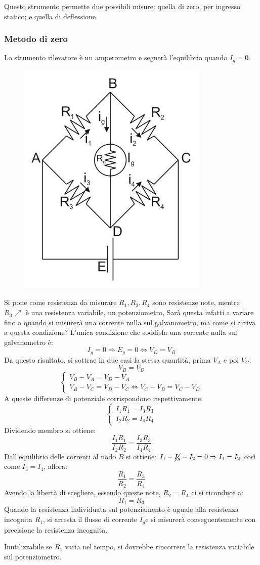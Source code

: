 \documentclass[a4paper, 15pt]{article}
\begin{document}
\begin{adjustwidth}{2in}{}
		Questo strumento permette due possibili misure: quella di zero, per ingresso statico; e quella di deflessione. 
\end{adjustwidth}
\newpage
\subsubsection{Metodo di zero}	
\begin{adjustwidth}{2in}{}
		Lo strumento rilevatore è un amperometro e segnerà l'equilibrio quando $I_g =0$. 		
\begin{figure}[H]
	\centering
	\includegraphics[width=0.3\linewidth]{fig/screenshot011}
	\label{fig:screenshot011.2}
\end{figure}		
		Si pone come resistenza da misurare $R_1, R_2, R_4$ sono resistenze note, mentre $R_3\nearrow$ è una resistenza variabile, un potenziometro, Sarà questa infatti a variare fino a quando si misurerà una corrente nulla sul galvanometro, ma come si arriva a questa condizione? L'unica condizione che soddisfa una corrente nulla sul galvanometro è:
		\[I_g = 0 \Rightarrow E_g = 0 \Leftrightarrow V_D = V_B\]
		Da questo risultato, si sottrae in due casi la stessa quantità, prima $V_A$ e poi $V_C$:
		\[V_B = V_D\]
		\[\begin{cases}
			V_B - V_A = V_D - V_A \\
			V_B - V_C = V_D - V_C \Leftrightarrow V_C - V_B = V_C - V_D
		\end{cases}
		\]
		A queste differenze di potenziale corrispondono rispettivamente:
		\[\begin{cases}
			I_1R_1 = I_3R_3 \\
			I_2R_2 = I_4R_4
		\end{cases}
		\]
		Dividendo membro si ottiene:
		\[\dfrac{I_1R_1}{I_2R_2} = \dfrac{I_3R_3}{I_4R_4}\]
		Dall'equilibrio delle correnti al nodo $B$ si ottiene: \(I_1 - \cancel{I_g} - I_2 = 0 \Rightarrow I_1 = I_2\) così come \(I_3 = I_4\), allora: 
		\[\dfrac{R_1}{R_2} = \dfrac{R_3}{R_4}\]
		Avendo la libertà di scegliere, essendo queste note, \(R_2 = R_4\) ci si riconduce a:
		\[ R_1 = R_3\]
		Quando la resistenza individuata sul potenziamento è uguale alla resistenza incognita $ R_1 $, si arresta il flusso di corrente $ I_g  $e si misurerà conseguentemente con precisione la resistenza incognita. \newline 
		
		Inutilizzabile se $R_1$ varia nel tempo, si dovrebbe rincorrere la resistenza variabile sul potenziometro.  
\end{adjustwidth}
\newpage
\end{document}

